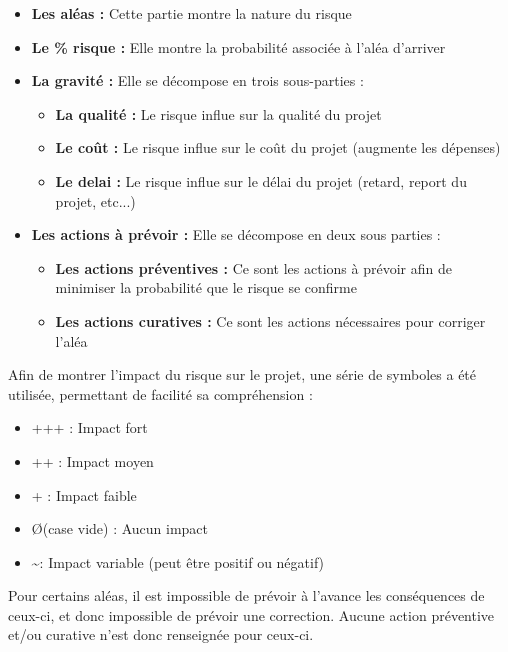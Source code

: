 \documentclass[french]{article}
\begin{document}
\begin{itemize}
	\item \textbf{Les aléas :} Cette partie montre la nature du risque
	\item \textbf{Le \% risque :} Elle montre la probabilité associée à l'aléa d'arriver
	\item \textbf{La gravité :} Elle se décompose en trois sous-parties :
	\begin{itemize}
		\item \textbf{La qualité :} Le risque influe sur la qualité du projet
		\item \textbf{Le coût :} Le risque influe sur le coût du projet (augmente les dépenses)
		\item \textbf{Le delai :} Le risque influe sur le délai du projet (retard, report du projet, etc...)
	\end{itemize}
	\item \textbf{Les actions à prévoir :} Elle se décompose en deux sous parties :
	\begin{itemize}
		\item \textbf{Les actions préventives :} Ce sont les actions à prévoir afin de minimiser la probabilité que le risque se confirme
		\item \textbf{Les actions curatives :} Ce sont les actions nécessaires pour corriger l'aléa
	\end{itemize}
\end{itemize}

Afin de montrer l'impact du risque sur le projet, une série de symboles a été utilisée, permettant de facilité sa compréhension :

\begin{itemize}
	\item +++ : Impact fort
	\item ++ : Impact moyen
	\item + : Impact faible
	\item \O (case vide) : Aucun impact
	\item \textasciitilde : Impact variable (peut être positif ou négatif)
\end{itemize}

Pour certains aléas, il est impossible de prévoir à l'avance les conséquences de ceux-ci, et donc impossible de prévoir une correction. Aucune action préventive et/ou curative n'est donc renseignée pour ceux-ci.
\end{document}
